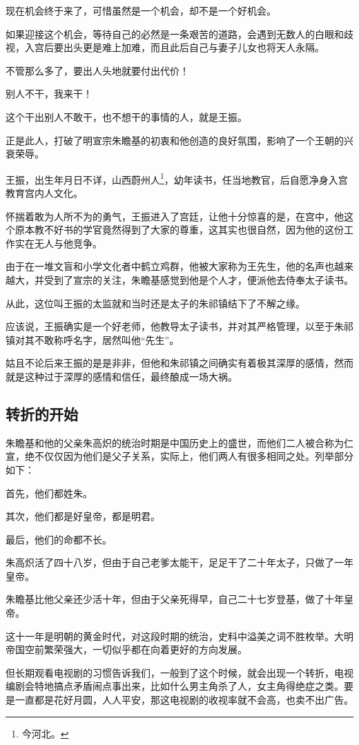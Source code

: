 \begin{multicols}{\theparacolNo}
现在机会终于来了，可惜虽然是一个机会，却不是一个好机会。

如果迎接这个机会，等待自己的必然是一条艰苦的道路，会遇到无数人的白眼和歧视，入宫后要出头更是难上加难，而且此后自己与妻子儿女也将天人永隔。

不管那么多了，要出人头地就要付出代价！

别人不干，我来干！

这个干出别人不敢干，也不想干的事情的人，就是王振。

正是此人，打破了明宣宗朱瞻基的初衷和他创造的良好氛围，影响了一个王朝的兴衰荣辱。

王振，出生年月日不详，山西蔚州人\footnote{今河北。}，幼年读书，任当地教官，后自愿净身入宫教育宫内人文化。

怀揣着敢为人所不为的勇气，王振进入了宫廷，让他十分惊喜的是，在宫中，他这个原本教不好书的学官竟然得到了大家的尊重，这其实也很自然，因为他的这份工作实在无人与他竞争。

由于在一堆文盲和小学文化者中鹤立鸡群，他被大家称为王先生，他的名声也越来越大，并受到了宣宗的关注，朱瞻基感觉到他是个人才，便派他去侍奉太子读书。

从此，这位叫王振的太监就和当时还是太子的朱祁镇结下了不解之缘。

应该说，王振确实是一个好老师，他教导太子读书，并对其严格管理，以至于朱祁镇对其不敢称呼名字，居然叫他“先生”。

姑且不论后来王振的是是非非，但他和朱祁镇之间确实有着极其深厚的感情，然而就是这种过于深厚的感情和信任，最终酿成一场大祸。

\subsection{转折的开始}
朱瞻基和他的父亲朱高炽的统治时期是中国历史上的盛世，而他们二人被合称为仁宣，绝不仅仅因为他们是父子关系，实际上，他们两人有很多相同之处。列举部分如下：

首先，他们都姓朱。

其次，他们都是好皇帝，都是明君。

最后，他们的命都不长。

朱高炽活了四十八岁，但由于自己老爹太能干，足足干了二十年太子，只做了一年皇帝。

朱瞻基比他父亲还少活十年，但由于父亲死得早，自己二十七岁登基，做了十年皇帝。

这十一年是明朝的黄金时代，对这段时期的统治，史料中溢美之词不胜枚举。大明帝国空前繁荣强大，一切似乎都在向着更好的方向发展。

但长期观看电视剧的习惯告诉我们，一般到了这个时候，就会出现一个转折，电视编剧会特地搞点矛盾闹点事出来，比如什么男主角杀了人，女主角得绝症之类。要是一直都是花好月圆，人人平安，那这电视剧的收视率就不会高，也卖不出广告。


\end{multicols}
